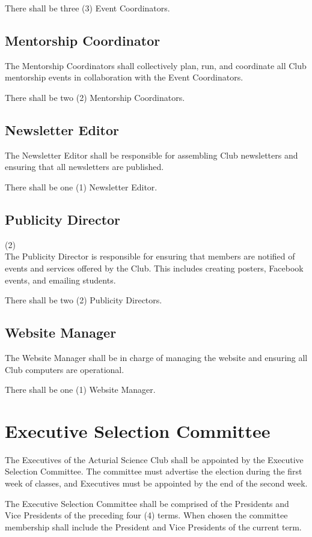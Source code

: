 \documentclass[11pt]{mathsoc}
\begin{document}
There shall be three (3) Event Coordinators.

\subsection{Mentorship Coordinator}
The Mentorship Coordinators shall collectively plan, run, and coordinate all 
Club mentorship events in collaboration with the Event Coordinators.

There shall be two (2) Mentorship Coordinators.

\subsection{Newsletter Editor}
The Newsletter Editor shall be responsible for assembling Club newsletters
and ensuring that all newsletters are published.

There shall be one (1) Newsletter Editor.

\subsection{Publicity Director} (2)\\
The Publicity Director is responsible for ensuring that members are notified 
of events and services offered by the Club. This includes creating posters, 
Facebook events, and emailing students. 

There shall be two (2) Publicity Directors.

\subsection{Website Manager} 
The Website Manager shall be in charge of managing the website and ensuring 
all Club computers are operational.

There shall be one (1) Website Manager.

\section{Executive Selection Committee}
The Executives of the Acturial Science Club shall be appointed by the 
Executive Selection Committee. The committee must advertise the election
during the first week of classes, and Executives must be appointed by the end
of the second week.

The Executive Selection Committee shall be comprised of the Presidents and Vice 
Presidents of the preceding four (4) terms. When chosen the committee membership
shall include the President and Vice Presidents of the current term.
\end{document}
